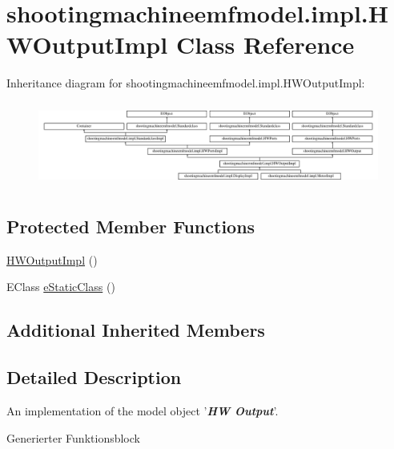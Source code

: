 \hypertarget{classshootingmachineemfmodel_1_1impl_1_1_h_w_output_impl}{\section{shootingmachineemfmodel.\-impl.\-H\-W\-Output\-Impl Class Reference}
\label{classshootingmachineemfmodel_1_1impl_1_1_h_w_output_impl}
}
Inheritance diagram for shootingmachineemfmodel.\-impl.\-H\-W\-Output\-Impl\-:\begin{figure}[H]
\begin{center}
\leavevmode
\includegraphics[height=2.809365cm]{classshootingmachineemfmodel_1_1impl_1_1_h_w_output_impl}
\end{center}
\end{figure}
\subsection*{Protected Member Functions}
\begin{DoxyCompactItemize}
\item 
\hyperlink{classshootingmachineemfmodel_1_1impl_1_1_h_w_output_impl_a5bd406b1a50fbbe19940f1de5f22d88a}{H\-W\-Output\-Impl} ()
\item 
E\-Class \hyperlink{classshootingmachineemfmodel_1_1impl_1_1_h_w_output_impl_ac072be0207240efee14a9b9f1815d42e}{e\-Static\-Class} ()
\end{DoxyCompactItemize}
\subsection*{Additional Inherited Members}


\subsection{Detailed Description}
An implementation of the model object '{\itshape {\bfseries H\-W Output}}'.

Generierter Funktionsblock 

